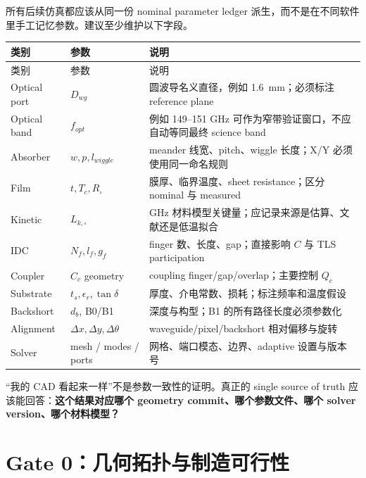 \documentclass[11pt,a4paper,openany]{ctexrep}
\begin{document}
所有后续仿真都应该从同一份 nominal parameter ledger 派生，而不是在不同软件里手工记忆参数。建议至少维护以下字段。

\begin{longtable}{p{3.0cm}p{3.0cm}p{7.4cm}}
\toprule
类别 & 参数 & 说明 \\
\midrule
\endfirsthead
\toprule
类别 & 参数 & 说明 \\
\midrule
\endhead
Optical port & $D_{wg}$ & 圆波导名义直径，例如 \SI{1.6}{mm}；必须标注 reference plane \\
Optical band & $f_{opt}$ & 例如 149--151 GHz 可作为窄带验证窗口，不应自动等同最终 science band \\
Absorber & $w,p,l_{wiggle}$ & meander 线宽、pitch、wiggle 长度；X/Y 必须使用同一命名规则 \\
Film & $t,T_c,R_\square$ & 膜厚、临界温度、sheet resistance；区分 nominal 与 measured \\
Kinetic & $L_{k,\square}$ & GHz 材料模型关键量；应记录来源是估算、文献还是低温拟合 \\
IDC & $N_f,l_f,g_f$ & finger 数、长度、gap；直接影响 $C$ 与 TLS participation \\
Coupler & $C_c$ geometry & coupling finger/gap/overlap；主要控制 $Q_c$ \\
Substrate & $t_s,\epsilon_r,\tan\delta$ & 厚度、介电常数、损耗；标注频率和温度假设 \\
Backshort & $d_b$, B0/B1 & 深度与构型；B1 的所有路径长度必须参数化 \\
Alignment & $\Delta x,\Delta y,\Delta\theta$ & waveguide/pixel/backshort 相对偏移与旋转 \\
Solver & mesh / modes / ports & 网格、端口模态、边界、adaptive 设置与版本号 \\
\bottomrule
\end{longtable}

\begin{mistakebox}
“我的 CAD 看起来一样”不是参数一致性的证明。真正的 single source of truth 应该能回答：\textbf{这个结果对应哪个 geometry commit、哪个参数文件、哪个 solver version、哪个材料模型？}
\end{mistakebox}

\section{Gate 0：几何拓扑与制造可行性}
\end{document}
